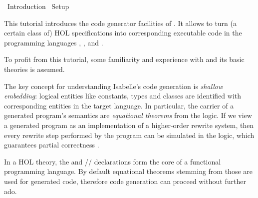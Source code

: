 %
\begin{isabellebody}%
\def\isabellecontext{Introduction}%
%
\isadelimtheory
%
\endisadelimtheory
%
\isatagtheory
{}\isamarkupfalse%
\ Introduction\isanewline
{}\ Setup\isanewline
{}%
\endisatagtheory
{\isafoldtheory}%
%
\isadelimtheory
%
\endisadelimtheory
%
\isamarkuptrue%
%
\begin{isamarkuptext}%
This tutorial introduces the code generator facilities of .  It allows to turn (a certain class of) HOL
  specifications into corresponding executable code in the programming
  languages  \cite{SML},  \cite{OCaml},
   \cite{haskell-revised-report} and 
  \cite{scala-overview-tech-report}.

  To profit from this tutorial, some familiarity and experience with
   \cite{isa-tutorial} and its basic theories is assumed.%
\end{isamarkuptext}%
\isamarkuptrue%
%
\isamarkuptrue%
%
\begin{isamarkuptext}%
The key concept for understanding Isabelle's code generation is
  \emph{shallow embedding}: logical entities like constants, types and
  classes are identified with corresponding entities in the target
  language.  In particular, the carrier of a generated program's
  semantics are \emph{equational theorems} from the logic.  If we view
  a generated program as an implementation of a higher-order rewrite
  system, then every rewrite step performed by the program can be
  simulated in the logic, which guarantees partial correctness
  \cite{Haftmann-Nipkow:2010:code}.%
\end{isamarkuptext}%
\isamarkuptrue%
%
\isamarkuptrue%
%
\begin{isamarkuptext}%
In a HOL theory, the \hypertarget{command.datatype}{\hyperlink{command.datatype}{\mbox{}}} and \hypertarget{command.definition}{\hyperlink{command.definition}{\mbox{}}}/\hypertarget{command.primrec}{\hyperlink{command.primrec}{\mbox{}}}/\hypertarget{command.fun}{\hyperlink{command.fun}{\mbox{}}} declarations
  form the core of a functional programming language.  By default
  equational theorems stemming from those are used for generated code,
  therefore  code generation can proceed without further
  ado.


\end{isamarkuptext}
\end{isabellebody}
